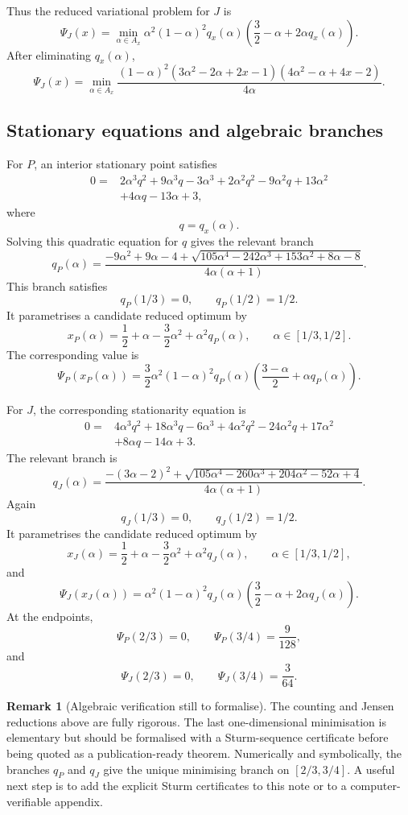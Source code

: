 \documentclass[11pt]{amsart}
\theoremstyle{definition}
\newtheorem{remark}[theorem]{Remark}
\newcommand{\1}{\mathbf 1}
\begin{document}
Thus the reduced variational problem for $J$ is
\[
\boxed{
   \Psi_J(x)=
   \min_{\alpha\in A_x}
   \alpha^2(1-\alpha)^2q_x(\alpha)
   \left(\frac32-\alpha+2\alpha q_x(\alpha)\right).
}
\]
After eliminating $q_x(\alpha)$,
\[
\boxed{
   \Psi_J(x)=
   \min_{\alpha\in A_x}
   \frac{(1-\alpha)^2
     (3\alpha^2-2\alpha+2x-1)
     (4\alpha^2-\alpha+4x-2)}{4\alpha}.
}
\]

\subsection{Stationary equations and algebraic branches}

For $P$, an interior stationary point satisfies
\[
\begin{split}
0={}&2\alpha^3q^2+9\alpha^3q-3\alpha^3
+2\alpha^2q^2-9\alpha^2q+13\alpha^2\\
&+4\alpha q-13\alpha+3,
\end{split}
\]
where
\[
   q=q_x(\alpha).
\]
Solving this quadratic equation for $q$ gives the relevant branch
\[
   q_P(\alpha)=
   \frac{-9\alpha^2+9\alpha-4+
   \sqrt{105\alpha^4-242\alpha^3+153\alpha^2+8\alpha-8}}
   {4\alpha(\alpha+1)}.
\]
This branch satisfies
\[
   q_P(1/3)=0,
   \qquad q_P(1/2)=1/2.
\]
It parametrises a candidate reduced optimum by
\[
   x_P(\alpha)=\frac12+\alpha-\frac32\alpha^2+
      \alpha^2q_P(\alpha),
   \qquad \alpha\in[1/3,1/2].
\]
The corresponding value is
\[
   \Psi_P(x_P(\alpha))=\frac32\alpha^2(1-\alpha)^2q_P(\alpha)
   \left(\frac{3-\alpha}{2}+\alpha q_P(\alpha)\right).
\]

For $J$, the corresponding stationarity equation is
\[
\begin{split}
0={}&4\alpha^3q^2+18\alpha^3q-6\alpha^3
+4\alpha^2q^2-24\alpha^2q+17\alpha^2\\
&+8\alpha q-14\alpha+3.
\end{split}
\]
The relevant branch is
\[
   q_J(\alpha)=
   \frac{-(3\alpha-2)^2+
   \sqrt{105\alpha^4-260\alpha^3+204\alpha^2-52\alpha+4}}
   {4\alpha(\alpha+1)}.
\]
Again
\[
   q_J(1/3)=0,
   \qquad q_J(1/2)=1/2.
\]
It parametrises the candidate reduced optimum by
\[
   x_J(\alpha)=\frac12+\alpha-\frac32\alpha^2+
      \alpha^2q_J(\alpha),
   \qquad \alpha\in[1/3,1/2],
\]
and
\[
   \Psi_J(x_J(\alpha))=
   \alpha^2(1-\alpha)^2q_J(\alpha)
   \left(\frac32-\alpha+2\alpha q_J(\alpha)\right).
\]
At the endpoints,
\[
   \Psi_P(2/3)=0,
   \qquad \Psi_P(3/4)=\frac9{128},
\]
and
\[
   \Psi_J(2/3)=0,
   \qquad \Psi_J(3/4)=\frac3{64}.
\]

\begin{remark}[Algebraic verification still to formalise]
The counting and Jensen reductions above are fully rigorous.  The last one-dimensional minimisation is elementary but should be formalised with a Sturm-sequence certificate before being quoted as a publication-ready theorem.  Numerically and symbolically, the branches $q_P$ and $q_J$ give the unique minimising branch on $[2/3,3/4]$.  A useful next step is to add the explicit Sturm certificates to this note or to a computer-verifiable appendix.
\end{remark}
\end{document}
